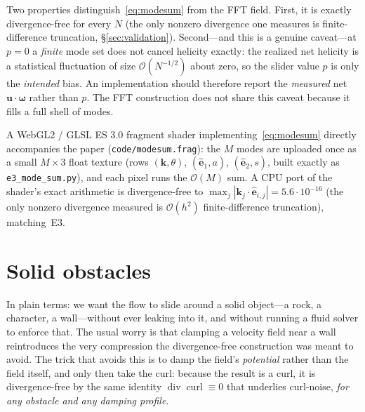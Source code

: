 \documentclass[11pt]{article}
\theoremstyle{remark}
\newcommand{\bk}{\mathbf{k}}
\newcommand{\bu}{\mathbf{u}}
\newcommand{\bomega}{\boldsymbol{\omega}}
\newcommand{\ehat}{\hat{\mathbf{e}}}
\DeclareMathOperator{\curl}{curl}
\DeclareMathOperator{\dvg}{div}
\begin{document}
Two properties distinguish~\eqref{eq:modesum} from the FFT field. First, it is exactly
divergence-free for every $N$ (the only nonzero divergence one measures is
finite-difference truncation, \S\ref{sec:validation}). Second---and this is a genuine
caveat---at $p=0$ a \emph{finite} mode set does not cancel helicity exactly: the realized net
helicity is a statistical fluctuation of size $\mathcal O(N^{-1/2})$ about zero, so the slider
value $p$ is only the \emph{intended} bias. An implementation should therefore report the
\emph{measured} net $\bu\cdot\bomega$ rather than $p$. The FFT construction does not share this
caveat because it fills a full shell of modes.

A WebGL2 / GLSL ES 3.0 fragment shader implementing~\eqref{eq:modesum} directly
accompanies the paper (\texttt{code/modesum.frag}): the $M$ modes are uploaded
once as a small $M\times3$ float texture (rows $(\bk,\theta)$, $(\ehat_1,a)$,
$(\ehat_2,s)$, built exactly as \texttt{e3\_mode\_sum.py}), and each pixel runs
the $\mathcal O(M)$ sum. A CPU port of the shader's exact arithmetic is
divergence-free to $\max_j|\bk_j\cdot\ehat_{i,j}|=5.6\cdot10^{-16}$ (the only
nonzero divergence measured is $\mathcal O(h^2)$ finite-difference truncation),
matching~E3.

\FloatBarrier
\section{Solid obstacles}
\label{sec:obstacles}

In plain terms: we want the flow to slide around a solid object---a rock, a
character, a wall---without ever leaking into it, and without running a fluid
solver to enforce that. The usual worry is that clamping a velocity field near a
wall reintroduces the very compression the divergence-free construction was meant
to avoid. The trick that avoids this is to damp the field's \emph{potential}
rather than the field itself, and only then take the curl: because the result is
a curl, it is divergence-free by the same identity $\dvg\curl\equiv0$ that
underlies curl-noise, \emph{for any obstacle and any damping profile}.
\end{document}
